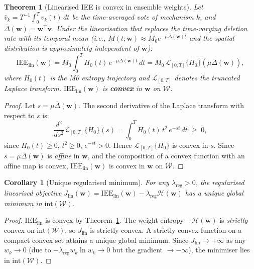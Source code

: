 \documentclass[review,12pt]{elsarticle}
\newcommand{\bfw}{\mathbf{w}}
\newcommand{\bfv}{\mathbf{v}}
\newcommand{\IEE}{\mathrm{IEE}}
\newtheorem{theorem}{Theorem}
\newtheorem{corollary}{Corollary}
\begin{document}
\begin{theorem}[Linearised IEE is convex in ensemble weights]
\label{thm:lin_convex}
Let $\bar{v}_k = T^{-1}\!\int_0^T\! v_k(t)\,dt$ be the time-averaged vote
of mechanism $k$, and $\bar{\Delta}(\bfw) = \bfw^\top\bar{\bfv}$.
Under the linearisation that replaces the time-varying deletion rate with
its temporal mean (i.e., $M(t;\bfw) \approx M_0 e^{-\mu\bar{\Delta}(\bfw)t}$
and the spatial distribution is approximately independent of $\bfw$):
\begin{equation}
  \IEE_{\mathrm{lin}}(\bfw)
    = M_0 \int_0^T H_0(t)\,e^{-\mu\bar{\Delta}(\bfw)t}\,dt
    = M_0\,\mathcal{L}_{[0,T]}\{H_0\}\!\left(\mu\bar{\Delta}(\bfw)\right),
  \label{eq:iee_lin}
\end{equation}
where $H_0(t)$ is the M0 entropy trajectory and $\mathcal{L}_{[0,T]}$
denotes the truncated Laplace transform. $\IEE_{\mathrm{lin}}(\bfw)$ is
\textbf{convex} in $\bfw$ on $\mathcal{W}$.
\end{theorem}

\begin{proof}
Let $s = \mu\bar{\Delta}(\bfw)$.  The second derivative of the Laplace transform
with respect to $s$ is:
\begin{equation}
  \frac{d^2}{ds^2}\mathcal{L}_{[0,T]}\{H_0\}(s)
  = \int_0^T H_0(t)\,t^2\,e^{-st}\,dt \;\geq\; 0,
  \label{eq:laplace_convex}
\end{equation}
since $H_0(t)\geq 0$, $t^2\geq 0$, $e^{-st}>0$.  Hence
$\mathcal{L}_{[0,T]}\{H_0\}$ is convex in $s$.
Since $s = \mu\bar{\Delta}(\bfw)$ is \emph{affine} in $\bfw$, and the composition
of a convex function with an affine map is convex,
$\IEE_{\mathrm{lin}}(\bfw)$ is convex in $\bfw$ on $\mathcal{W}$.
\end{proof}

\begin{corollary}[Unique regularised minimum]
\label{cor:unique}
For any $\lambda_{\mathrm{reg}} > 0$, the regularised linearised objective
$J_{\mathrm{lin}}(\bfw) = \IEE_{\mathrm{lin}}(\bfw) - \lambda_{\mathrm{reg}}\mathcal{H}(\bfw)$
has a unique global minimum in $\mathrm{int}(\mathcal{W})$.
\end{corollary}

\begin{proof}
$\IEE_{\mathrm{lin}}$ is convex by Theorem~\ref{thm:lin_convex}.
The weight entropy $-\mathcal{H}(\bfw)$ is \emph{strictly} convex on
$\mathrm{int}(\mathcal{W})$, so $J_{\mathrm{lin}}$ is strictly convex.
A strictly convex function on a compact convex set attains a unique
global minimum.  Since $J_{\mathrm{lin}} \to +\infty$ as any
$w_k \to 0$ (due to $-\lambda_{\mathrm{reg}} w_k \ln w_k \to 0$ but
the gradient $\to -\infty$), the minimiser lies in
$\mathrm{int}(\mathcal{W})$.
\end{proof}
\end{document}
